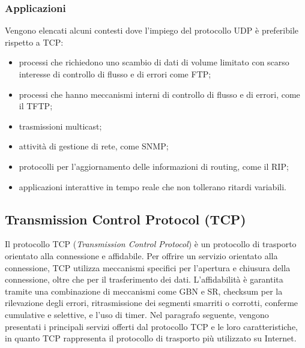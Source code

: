 \documentclass[12pt]{report}
\begin{document}
	\subsubsection{Applicazioni}
	Vengono elencati alcuni contesti dove l'impiego del protocollo UDP è preferibile rispetto a TCP:
	\begin{itemize}
		\item processi che richiedono uno scambio di dati di volume limitato con scarso interesse di controllo di flusso e di errori come FTP;
		\item processi che hanno meccanismi interni di controllo di flusso e di errori, come il TFTP;
		\item trasmissioni multicast;
		\item attività di gestione di rete, come SNMP;
		\item protocolli per l'aggiornamento delle informazioni di routing, come il RIP;
		\item applicazioni interattive in tempo reale che non tollerano ritardi variabili.
	\end{itemize}

	\subsection{Transmission Control Protocol (TCP)}
	Il protocollo TCP (\textit{Transmission Control Protocol}) è un protocollo di trasporto orientato alla connessione e affidabile. Per offrire un servizio orientato alla connessione, TCP utilizza meccanismi specifici per l’apertura e chiusura della connessione, oltre che per il trasferimento dei dati. L'affidabilità è garantita tramite una combinazione di meccanismi come GBN e SR, checksum per la rilevazione degli errori, ritrasmissione dei segmenti smarriti o corrotti, conferme cumulative e selettive, e l'uso di timer. Nel paragrafo seguente, vengono presentati i principali servizi offerti dal protocollo TCP e le loro caratteristiche, in quanto TCP rappresenta il protocollo di trasporto più utilizzato su Internet.
\end{document}
